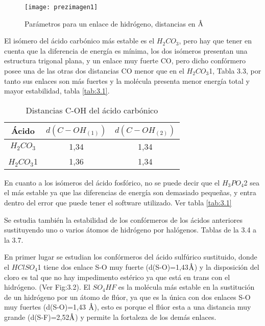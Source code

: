 \begin{figure}[H]
	\centering
	\texttt{[image: prezimagen1]}
	\caption{Parámetros para un enlace de hidrógeno, distancias en $\mbox{\normalfont\AA}$}
\end{figure}

El isómero del ácido carbónico más estable es el $H_2CO_3$, pero hay que tener en cuenta que la diferencia de energía es mínima, los dos isómeros presentan una estructura trigonal plana, y un enlace muy fuerte CO, pero dicho confórmero posee una de las otras dos distancias CO menor que en el $H_2CO_3$1, Tabla 3.3, por tanto sus enlaces son más fuertes y la molécula presenta menor energía total y mayor estabilidad, tabla \ref{tab:3.1}. 
\begin{table}[H]
    \centering
    \begin{tabular}{|c|c|c|}
    \hline
    Ácido & $d(C-OH_{(1)})$ & $d(C-OH_{(2)})$ \\ \hline
    $H_2CO_3$ & 1,34 & 1,34  \\ \hline
    $H_2CO_3$1 & 1,36 & 1,34 \\ \hline 
    \end{tabular}
    \caption{Distancias C-OH del ácido carbónico}
\end{table}

En cuanto a los isómeros del ácido fosfórico, no se puede decir que el $H_3PO_4$2 sea el más estable ya que las diferencias de energía son demasiado pequeñas, y entra dentro del error que puede tener el software utilizado. Ver tabla \ref{tab:3.1}

Se estudia también la estabilidad de los confórmeros de los ácidos anteriores sustituyendo uno o varios átomos de hidrógeno por halógenos. Tablas de la 3.4 a la 3.7.

En primer lugar se estudian los confórmeros del ácido sulfúrico sustituido, donde el $HClSO_4$1 tiene dos enlace S-O muy fuerte (d(S-O)=1,43$\mbox{\normalfont\AA}$) y la disposición del cloro es tal que no hay impedimento estérico ya que está en trans con el hidrógeno. (Ver Fig:3.2). El $SO_4HF$ es la molécula más estable en la sustitución de un hidrógeno por un átomo de flúor, ya que es la única con dos enlaces S-O muy fuertes (d(S-O)=1,43 $\mbox{\normalfont\AA}$), esto es porque el flúor esta a una distancia muy grande (d(S-F)=2,52$\mbox{\normalfont\AA}$) y permite la fortaleza de los demás enlaces.

